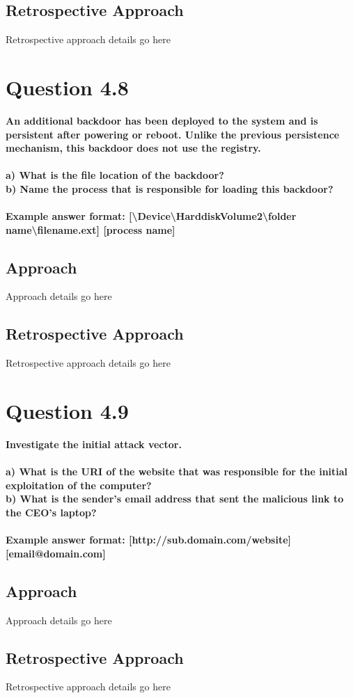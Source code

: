 \subsection{Retrospective Approach}
Retrospective approach details go here

\section{Question 4.8}
\textbf{An additional backdoor has been deployed to the system and is persistent
after powering or reboot. Unlike the previous persistence mechanism, this
backdoor does not use the registry.
\\
\\a) What is the file location of the backdoor?
\\b) Name the process that is responsible for loading this backdoor?
\\\\
Example answer format:
[\textbackslash{}Device\textbackslash{}HarddiskVolume2\textbackslash{}folder
name\textbackslash{}filename.ext] [process name]}
\subsection{Approach}
Approach details go here
\subsection{Retrospective Approach}
Retrospective approach details go here

\section{Question 4.9}
\textbf{Investigate the initial attack vector.
\\
\\a) What is the URI of the website that was responsible for the initial
exploitation of the computer?
\\b) What is the sender's email address that sent the malicious link to the
CEO's laptop?
\\\\
Example answer format: [http://sub.domain.com/website] [email@domain.com]}
\subsection{Approach}
Approach details go here
\subsection{Retrospective Approach}
Retrospective approach details go here
